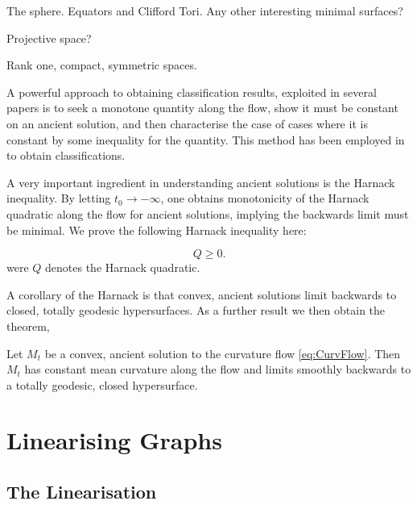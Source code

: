 \documentclass{amsart}
\begin{document}
\begin{example}
The sphere. Equators and Clifford Tori. Any other interesting minimal surfaces?
\end{example}

\begin{example}
Projective space?
\end{example}

\begin{example}
Rank one, compact, symmetric spaces.
\end{example}

A powerful approach to obtaining classification results, exploited in several papers is to seek a monotone quantity along the flow, show it must be constant on an ancient solution, and then characterise the case of cases where it is constant by some inequality for the quantity. This method has been employed in \cite{} to obtain classifications.

A very important ingredient in understanding ancient solutions is the Harnack inequality. By letting \(t_0 \to -\infty\), one obtains monotonicity of the Harnack quadratic along the flow for ancient solutions, implying the backwards limit must be minimal. We prove the following Harnack inequality here:

\begin{thm}
\[
Q \geq 0.
\]
were \(Q\) denotes the Harnack quadratic.
\end{thm}

A corollary of the Harnack is that convex, ancient solutions limit backwards to closed, totally geodesic hypersurfaces. As a further result we then obtain the theorem,

\begin{thm}
Let \(M_t\) be a convex, ancient solution to the curvature flow \eqref{eq:CurvFlow}. Then \(M_t\) has constant mean curvature along the flow and limits smoothly backwards to a totally geodesic, closed hypersurface.
\end{thm}


\section{Linearising Graphs}
\label{sec:linearising_graphs}

\subsection{The Linearisation}
\label{subsec:linearisation}
\end{document}
